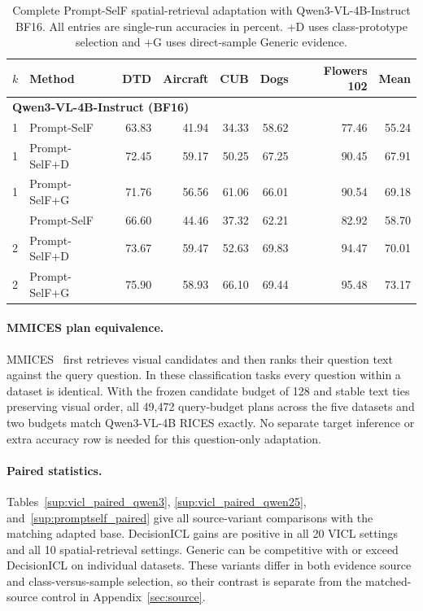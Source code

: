 \documentclass[10pt,twocolumn,letterpaper]{article}
\begin{document}
\begin{table}[t]
\caption{Complete Prompt-SelF spatial-retrieval adaptation with Qwen3-VL-4B-Instruct BF16. All entries are single-run accuracies in percent. +D uses class-prototype selection and +G uses direct-sample Generic evidence.}
\label{sup:promptself_accuracy}
\centering\small\setlength{\tabcolsep}{6pt}
\begin{tabular}{llrrrrrr}
\toprule
$k$ & Method & DTD & Aircraft & CUB & Dogs & Flowers 102 & Mean \\
\midrule
\multicolumn{8}{l}{\textbf{Qwen3-VL-4B-Instruct (BF16)}} \\
1 & Prompt-SelF & 63.83 & 41.94 & 34.33 & 58.62 & 77.46 & 55.24 \\
1 & Prompt-SelF+D & 72.45 & 59.17 & 50.25 & 67.25 & 90.45 & 67.91 \\
1 & Prompt-SelF+G & 71.76 & 56.56 & 61.06 & 66.01 & 90.54 & 69.18 \\
\addlinespace[2pt]
2 & Prompt-SelF & 66.60 & 44.46 & 37.32 & 62.21 & 82.92 & 58.70 \\
2 & Prompt-SelF+D & 73.67 & 59.47 & 52.63 & 69.83 & 94.47 & 70.01 \\
2 & Prompt-SelF+G & 75.90 & 58.93 & 66.10 & 69.44 & 95.48 & 73.17 \\
\bottomrule
\end{tabular}
\end{table}

\paragraph{MMICES plan equivalence.}
MMICES~\cite{mmices} first retrieves visual candidates and then ranks their question text against the query question. In these classification tasks every question within a dataset is identical. With the frozen candidate budget of 128 and stable text ties preserving visual order, all 49,472 query-budget plans across the five datasets and two budgets match Qwen3-VL-4B RICES exactly. No separate target inference or extra accuracy row is needed for this question-only adaptation.

\paragraph{Paired statistics.}
Tables~\ref{sup:vicl_paired_qwen3}, \ref{sup:vicl_paired_qwen25}, and~\ref{sup:promptself_paired} give all source-variant comparisons with the matching adapted base. DecisionICL gains are positive in all 20 VICL settings and all 10 spatial-retrieval settings. Generic can be competitive with or exceed DecisionICL on individual datasets. These variants differ in both evidence source and class-versus-sample selection, so their contrast is separate from the matched-source control in Appendix~\ref{sec:source}.
\end{document}
